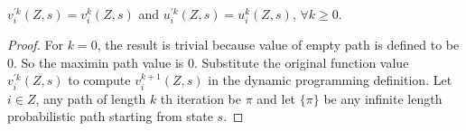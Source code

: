 \begin{theorem}
	$v_i^{'k}(Z,s)=v_i^{k}(Z,s)$ and $u_i^{'k}(Z,s)=u_i^{k}(Z,s)$, $ \forall k \ge 0 $.
\end{theorem}

\begin{proof}
	For $k=0$, the result is trivial because value of empty path is defined to be $0$. So the maximin path value is 0.
	Substitute the original function value $v_i^{'k}(Z,s)$ to compute $v_i^{k+1}(Z,s)$ in the dynamic programming definition. 
	Let $i \in Z$, 
	any path of length $k$  th iteration be $\pi$ and let $\{\pi\}$ be any infinite length probabilistic path starting from state $s$.
	


\end{proof}
